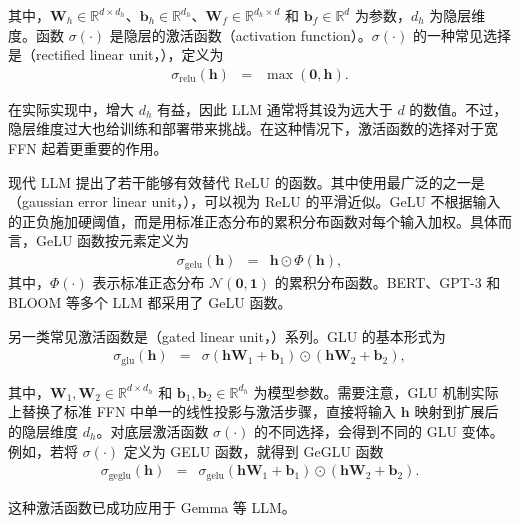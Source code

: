 \noindent 其中，$\mathbf{W}_h \in \mathbb{R}^{d \times d_h}$、$\mathbf{b}_h \in \mathbb{R}^{d_h}$、$\mathbf{W}_f \in \mathbb{R}^{d_h \times d}$ 和 $\mathbf{b}_f \in \mathbb{R}^d$ 为参数，$d_h$ 为隐层维度。函数 $\sigma(\cdot)$ 是隐层的激活函数（activation function）。$\sigma(\cdot)$ 的一种常见选择是（rectified linear unit，），定义为
\begin{eqnarray}
\sigma_{\mathrm{relu}}(\mathbf{h}) & = & \max(\mathbf{0}, \mathbf{h}).
\end{eqnarray}

在实际实现中，增大 $d_h$ 有益，因此 LLM 通常将其设为远大于 $d$ 的数值。不过，隐层维度过大也给训练和部署带来挑战。在这种情况下，激活函数的选择对于宽 FFN 起着更重要的作用。

现代 LLM 提出了若干能够有效替代 ReLU 的函数。其中使用最广泛的之一是（gaussian error linear unit，），可以视为 ReLU 的平滑近似。GeLU 不根据输入的正负施加硬阈值，而是用标准正态分布的累积分布函数对每个输入加权。具体而言，GeLU 函数按元素定义为
\begin{eqnarray}
\sigma_{\mathrm{gelu}}(\mathbf{h}) & = & \mathbf{h} \odot \Phi(\mathbf{h}),
\end{eqnarray}
\noindent 其中，$\Phi(\cdot)$ 表示标准正态分布 $\mathcal{N}(\mathbf{0},\mathbf{1})$ 的累积分布函数。BERT、GPT-3 和 BLOOM 等多个 LLM 都采用了 GeLU 函数。

另一类常见激活函数是（gated linear unit，）系列。GLU 的基本形式为
\begin{eqnarray}
\sigma_{\mathrm{glu}}(\mathbf{h}) & = & \sigma(\mathbf{h}\mathbf{W}_1 + \mathbf{b}_1) \odot (\mathbf{h}\mathbf{W}_2 + \mathbf{b}_2),
\end{eqnarray}

\noindent 其中，$\mathbf{W}_1, \mathbf{W}_2 \in \mathbb{R}^{d \times d_h}$ 和 $\mathbf{b}_1, \mathbf{b}_2 \in \mathbb{R}^{d_h}$ 为模型参数。需要注意，GLU 机制实际上替换了标准 FFN 中单一的线性投影与激活步骤，直接将输入 $\mathbf{h}$ 映射到扩展后的隐层维度 $d_h$。对底层激活函数 $\sigma(\cdot)$ 的不同选择，会得到不同的 GLU 变体。例如，若将 $\sigma(\cdot)$ 定义为 GELU 函数，就得到 GeGLU 函数
\begin{eqnarray}
\sigma_{\mathrm{geglu}}(\mathbf{h}) & = & \sigma_{\mathrm{gelu}}(\mathbf{h}\mathbf{W}_1 + \mathbf{b}_1) \odot (\mathbf{h}\mathbf{W}_2 + \mathbf{b}_2).
\end{eqnarray}

\noindent 这种激活函数已成功应用于 Gemma 等 LLM。

